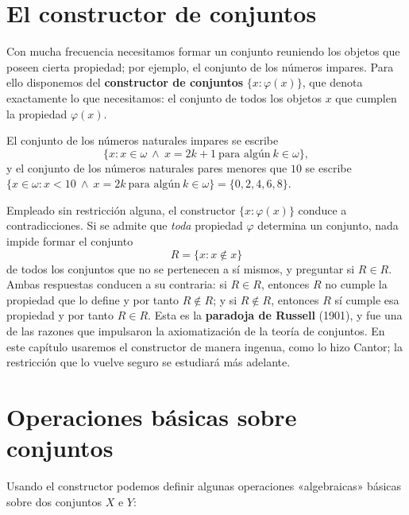 \section{El constructor de conjuntos}

Con mucha frecuencia necesitamos formar un conjunto reuniendo los objetos que poseen cierta propiedad; por ejemplo, el
conjunto de los números impares. Para ello disponemos del \textbf{constructor de conjuntos} $\{x : \varphi(x)\}$, que denota exactamente lo que necesitamos: el conjunto de todos los objetos $x$ que
cumplen la propiedad $\varphi(x)$.

\begin{example}
    El conjunto de los números naturales impares se escribe
    \[
        \{x : x \in \omega \ \wedge \ x = 2k + 1 \ \text{para algún} \ k \in \omega\},
    \]
    y el conjunto de los números naturales pares menores que $10$ se escribe $\{x \in \omega : x < 10 \ \wedge \ x = 2k \
        \text{para algún} \ k \in \omega\} = \{0, 2, 4, 6, 8\}$.
\end{example}

\begin{remark}
    Empleado sin restricción alguna, el constructor $\{x : \varphi(x)\}$ conduce a contradicciones. Si se admite que
    \emph{toda} propiedad $\varphi$ determina un conjunto, nada impide formar el conjunto
    \[
        R = \{x : x \notin x\}
    \]
    de todos los conjuntos que no se pertenecen a sí mismos, y preguntar si $R \in R$. Ambas respuestas conducen a su
    contraria: si $R \in R$, entonces $R$ no cumple la propiedad que lo define y por tanto $R \notin R$; y si $R \notin R$,
    entonces $R$ sí cumple esa propiedad y por tanto $R \in R$. Esta es la \textbf{paradoja de Russell}\index{paradoja de
        Russell} (1901), y fue una de las razones que impulsaron la axiomatización de la teoría de conjuntos. En este capítulo
    usaremos el constructor de manera ingenua, como lo hizo Cantor; la restricción que lo vuelve seguro se estudiará más
    adelante.
\end{remark}

\section{Operaciones básicas sobre conjuntos}

Usando el constructor podemos definir algunas operaciones «algebraicas» básicas sobre dos conjuntos $X$ e $Y$:


